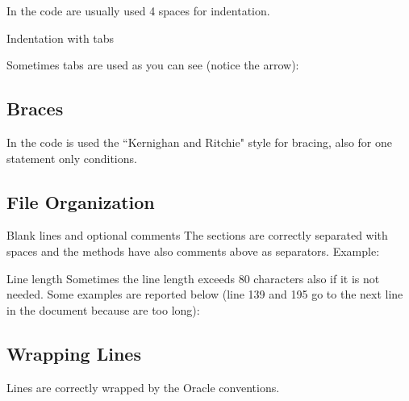 \documentclass[9pt]{beamer}
\makeatletter
\newcommand*{\currentname}{\@currentlabelname}
\makeatother
\begin{document}
\begin{frame}{\currentname}

In the code are usually used 4 spaces for indentation.

\begin{alertblock}{Indentation with tabs}

Sometimes tabs are used as you can see (notice the arrow):

\end{alertblock}
\end{frame}

\subsection{Braces}

\begin{frame}{\currentname}

In the code is used the “Kernighan and Ritchie" style for bracing, also for one statement only conditions.


\end{frame}

\subsection{File Organization}

\begin{frame}[allowframebreaks]{\currentname}
\begin{exampleblock}{Blank lines and optional comments}
The sections are correctly separated with spaces and the methods have also comments above as separators.
Example:
\end{exampleblock}

\begin{alertblock}{Line length}
Sometimes the line length exceeds 80 characters also if it is not needed. Some examples are reported below (line 139 and 195 go to the next line in the document because are too long):
\end{alertblock}

\end{frame}

\subsection{Wrapping Lines}

\begin{frame}{\currentname}
\begin{exampleblock}{}
Lines are correctly wrapped by the Oracle conventions.
\end{exampleblock}
\end{frame}
\end{document}
